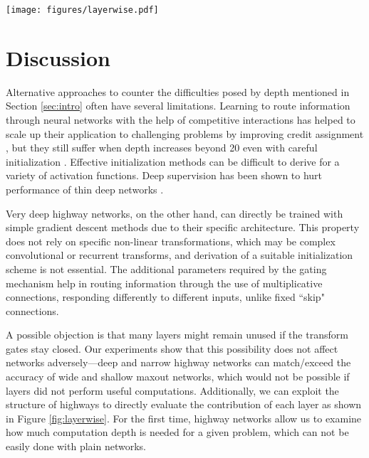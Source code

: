 \documentclass{article}
\begin{document}
\begin{figure*}[t]
\texttt{[image: figures/layerwise.pdf]}
\caption{Lesioned training set performance (y-axis) of the best 50-layer highway networks on MNIST (left) and CIFAR-100 (right), as a function of the lesioned layer (x-axis). Evaluated on the full training set while forcefully closing all the transform gates of a single layer at a time. The non-lesioned performance is indicated as a dashed line at the bottom.}
\label{fig:layerwise}
\end{figure*}


\section{Discussion}
Alternative approaches to counter the difficulties posed by depth mentioned in Section \ref{sec:intro} often have several limitations. Learning to route information through neural networks with the help of competitive interactions has helped to scale up their application to challenging problems by improving credit assignment \cite{Srivastava2015a}, but they still suffer when depth increases beyond 20 even with careful initialization \cite{He2015}. Effective initialization methods can be difficult to derive for a variety of activation functions. Deep supervision \cite{Lee2015} has been shown to hurt performance of thin deep networks \cite{Romero2014}. 

Very deep highway networks, on the other hand, can directly be trained with simple gradient descent methods due to their specific architecture. This property does not rely on specific non-linear transformations, which may be complex convolutional or recurrent transforms, and derivation of a suitable initialization scheme is not essential.
The additional parameters required by the gating mechanism help in routing information through the use of multiplicative connections, responding differently to different inputs, unlike fixed ``skip" connections.

A possible objection is that many layers might remain unused if the transform gates stay closed. Our experiments show that this possibility does not affect networks adversely---deep and narrow highway networks can match/exceed the accuracy of wide and shallow maxout networks, which would not be possible if layers did not perform useful computations. Additionally, we can exploit the structure of highways to directly evaluate the contribution of each layer as shown in Figure \ref{fig:layerwise}. For the first time, highway networks allow us to examine how much computation depth is needed for a given problem, which can not be easily done with plain networks. 
\end{document}
